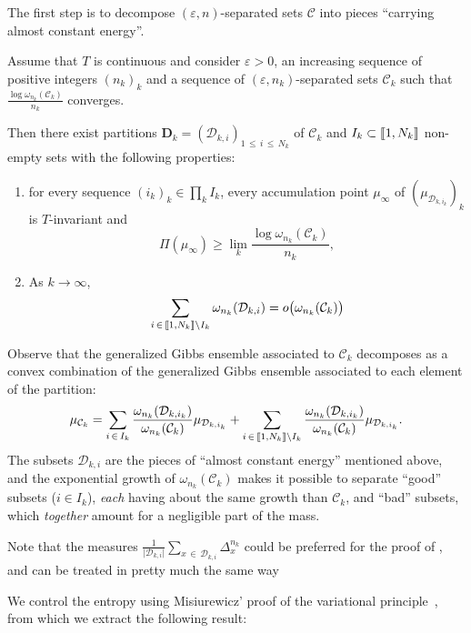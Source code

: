 \documentclass[AHL, Unicode, longabstracts,published]{cedram}
\theoremstyle{plain}
\theoremstyle{plain}
\newcommand\NLP{\Pi}
\newcounter{In}
\newcommand{\Inref}[1]{\Circled{\ref{#1}}}
\newcommand*\8{\infty}
\newcommand{\cD}{\mathcal{D}}
\newcommand{\cC}{\mathcal C}
\newcommand{\bfD}{\mathbf{D}}
\newcommand{\llbracket}{\mathopen{[\mkern -2.7mu[}}
\newcommand{\rrbracket}{\mathclose{]\mkern -2.7mu]}}
\newcommand*{\romanenumi}{\renewcommand*{\theenumi}{\roman{enumi}}}
\begin{document}
The first step is to decompose $(\varepsilon,n)$-separated sets $\cC$ into pieces ``carrying almost constant energy''.

\begin{theo}\label{thm-Gibbs}
Assume that $T$ is continuous and consider $\varepsilon>0$, an increasing sequence of positive integers $(n_k)_k$ and a sequence of $(\varepsilon,n_k)$-separated sets $\cC_k$ such that $\frac{\log \omega_{n_k}(\cC_k)}{n_k}$ converges.

Then there exist partitions $\bfD_k=(\cD_{k,i})_{1\,\le\,i\,\le\,N_k}$ of $\cC_k$ and $I_k\subset \llbracket 1,N_k\rrbracket$ non-empty sets with the following properties:
\begin{enumerate}\romanenumi
\item\label{enumi-Gibbs-i}
for every sequence $(i_k)_k \in\prod_k I_k$, every accumulation point $\mu_\infty$ of $(\mu_{\cD_{k,i_k}})_k$ is $T$-invariant and
\[
\NLP(\mu_\infty) \ge \lim_k \frac{\log \omega_{n_k}(\cC_k)}{n_k},
\]
\item\label{enumi-Gibbs-ii}
As $k\to\infty$,
\[
\sum_{i\,\in\,\llbracket 1,N_k\rrbracket\setminus I_k} \omega_{n_k}(\cD_{k,i}) = o\big(\omega_{n_k}(\cC_k) \big)
\]
\end{enumerate}
\end{theo}

Observe that the generalized Gibbs ensemble associated to $\cC_k$ decomposes as a convex combination of the generalized Gibbs ensemble associated to each element of the partition:
\[
\mu_{\cC_k} = \sum_{i\,\in\,I_k} \frac{\omega_{n_k}(\cD_{k,i_k})}{\omega_{n_k}(\cC_k)} \mu_{\cD_{k,i_k}} + \sum_{i\,\in\,\llbracket 1,N_k\rrbracket\setminus I_k} \frac{\omega_{n_k}(\cD_{k,i_k})}{\omega_{n_k}(\cC_k)} \mu_{\cD_{k,i_k}}.
\]
The subsets $\cD_{k,i}$ are the pieces of ``almost constant energy'' mentioned above, and the exponential growth of $\omega_{n_k}(\cC_k)$ makes it possible to separate ``good'' subsets ($i\in I_k$), \emph{each} having about the same growth than $\cC_k$, and ``bad'' subsets, which \emph{together} amount for a negligible part of the mass.

Note that the measures $\frac{1}{\lvert \cD_{k,i} \rvert} \sum_{x\,\in\,\cD_{k,i}} \Delta_x^{n_k}$ could be preferred for the proof of \Inref{In:3}, and can be treated in pretty much the same way


We control the entropy using Misiurewicz' proof of the variational principle~\cite{Misiurewicz-VP}, from which we extract the following result:
\end{document}
